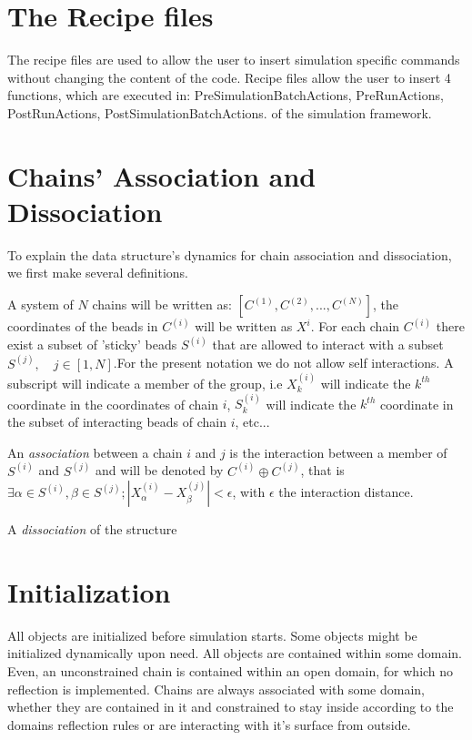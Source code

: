 \documentclass[12pt]{report}
\begin{document}
\section{The Recipe files}
The recipe files are used to allow the user to insert simulation specific commands without changing the content of the code. Recipe files allow the user to insert 4 functions, which are executed in: PreSimulationBatchActions, PreRunActions, PostRunActions, PostSimulationBatchActions. of the simulation framework. 

\section{Chains' Association and Dissociation} 
To explain the data structure's dynamics for chain association and dissociation, we first make several definitions.

A system of $N$ chains will be written as:  $[C^{(1)},C^{(2)},...,C^{(N)} ]$, the coordinates of the beads in $C^{(i)}$ will be written as $X^{i}$. For each chain $C^{(i)}$ there exist a subset of 'sticky' beads $S^{(i)}$ that are allowed to interact with a subset $S^{(j)},\quad j\in [1,N]$.For the present notation we do not allow self interactions. A subscript will indicate a member of the group, i.e $X^{(i)}_k$ will indicate the $k^{th}$ coordinate in the coordinates of chain $i$, $S^{(i)}_k$ will indicate the $k^{th}$ coordinate in the subset of interacting beads of chain $i$, etc... 

An \textit{association} between a chain $i$ and $j$ is the interaction between a member of $S^{(i)}$ and $S^{(j)}$ and will be denoted by  
$C^{(i)}\oplus C^{(j)}$, that is $\exists \alpha \in S^{(i)},\beta \in S^{(j)}; |X^{(i)}_\alpha-X^{(j)}_\beta |<\epsilon$, with $\epsilon$ the interaction distance.

A \textit{dissociation} of the structure 

\section{Initialization}\label{section_Initialization}

All objects are initialized before simulation starts. Some objects might be initialized dynamically upon need. 
All objects are contained within some domain. Even, an unconstrained chain is contained within an open domain, for which no reflection is implemented.
Chains are always associated with some domain, whether they are contained in it and constrained to stay inside according to the domains reflection rules or are interacting with it's surface from outside.
\end{document}
